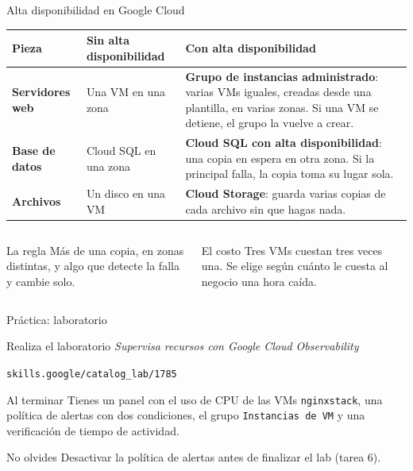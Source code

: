 \documentclass[aspectratio=169,10pt,c]{beamer}
\begin{document}
\begin{frame}{Alta disponibilidad en Google Cloud}
\renewcommand{\arraystretch}{1.35}
\centering\small
\begin{tabular}{@{}p{2.6cm}>{\raggedright\arraybackslash}p{3.8cm}>{\raggedright\arraybackslash}p{6.2cm}@{}}
\toprule
\textbf{Pieza} & \textbf{Sin alta disponibilidad} & \textbf{Con alta disponibilidad}\\
\midrule
\textbf{Servidores web} & Una VM en una zona & \textbf{Grupo de instancias administrado}: varias VMs iguales, creadas desde una plantilla, en varias zonas. Si una VM se detiene, el grupo la vuelve a crear.\\
\textbf{Base de datos} & Cloud SQL en una zona & \textbf{Cloud SQL con alta disponibilidad}: una copia en espera en otra zona. Si la principal falla, la copia toma su lugar sola.\\
\textbf{Archivos} & Un disco en una VM & \textbf{Cloud Storage}: guarda varias copias de cada archivo sin que hagas nada.\\
\bottomrule
\end{tabular}
\par\vspace{3mm}
\begin{columns}[T,onlytextwidth]
\begin{block}{La regla}
\small Más de una copia, en zonas distintas, y algo que detecte la falla y cambie solo.
\end{block}
\begin{alertblock}{El costo}
\small Tres VMs cuestan tres veces una. Se elige según cuánto le cuesta al negocio una hora caída.
\end{alertblock}
\end{columns}
\end{frame}

\begin{frame}[c]{Práctica: laboratorio}
\begin{block}{Realiza el laboratorio}
\large \textit{Supervisa recursos con Google Cloud Observability}\par\vspace{1mm}
\small\texttt{skills.google/catalog\_lab/1785}
\end{block}
\begin{exampleblock}{Al terminar}
\small Tienes un panel con el uso de CPU de las VMs \texttt{nginxstack}, una política de alertas con dos condiciones, el grupo \texttt{Instancias de VM} y una verificación de tiempo de actividad.
\end{exampleblock}
\begin{alertblock}{No olvides}
\small Desactivar la política de alertas antes de finalizar el lab (tarea 6).
\end{alertblock}
\end{frame}
\end{document}

